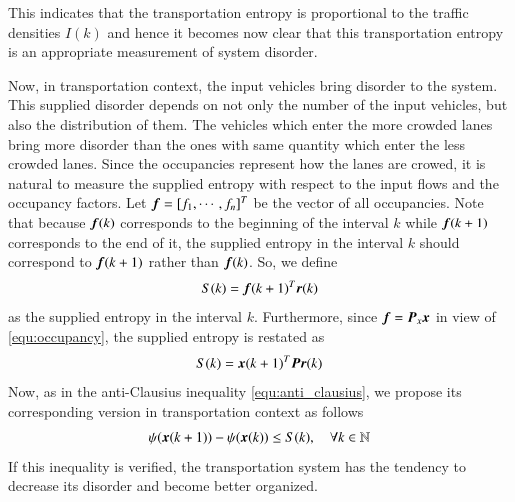 \documentclass[preprint,authoryear,12pt]{elsarticle}
\renewcommand{\vec}[1]{\mbox{\boldmath$#1$}}
\newcommand{\mat}[1]{\mbox{\boldmath$#1$}}
\begin{document}
This indicates that the transportation entropy is proportional to the
traffic densities $I(k)$ and hence it becomes now clear that this
transportation entropy is an appropriate measurement of system
disorder.

Now, in transportation context, the input vehicles bring disorder to
the system. This supplied disorder depends on not only the number of
the input vehicles, but also the distribution of them. The vehicles
which enter the more crowded lanes bring more disorder than the ones
with same quantity which enter the less crowded lanes. Since the
occupancies represent how the lanes are crowed, it is natural to
measure the supplied entropy with respect to the input flows and the
occupancy factors. Let $\vec{f}=[f_1,\cdots,f_n]^T$ be the vector of
all occupancies. Note that because $\vec{f}(k)$ corresponds to the
beginning of the interval $k$ while $\vec{f}(k+1)$ corresponds to the
end of it, the supplied entropy in the interval $k$ should correspond
to $\vec{f}(k+1)$ rather than $\vec{f}(k)$. So, we define
$$S(k)=\vec{f}(k+1)^T\vec{r}(k)$$
as the supplied entropy in the interval $k$. Furthermore, since
$\vec{f}=\mat{P}_x\vec{x}$ in view of \eqref{equ:occupancy}, the
supplied entropy is restated as
\begin{equation}\label{equ:supply}
    S(k)=\vec{x}(k+1)^T \mat{P} \vec{r}(k)
\end{equation}
Now, as in the anti-Clausius inequality \eqref{equ:anti_clausius}, we
propose its corresponding version in transportation context as
follows
\begin{equation}\label{equ:dissipative}
\psi(\vec{x}(k+1))-\psi(\vec{x}(k)) \leq S(k),\quad \forall
k\in\mathbb{N}
\end{equation}
If this inequality is verified, the transportation system has the
tendency to decrease its disorder and become better organized.
\end{document}
